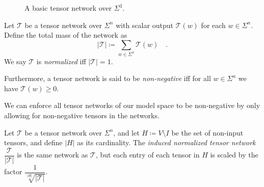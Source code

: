 \documentclass[../../main.tex]{subfiles}
\begin{document}
    \begin{figure}[h]
    \center
    \caption{A basic tensor network over $\Sigma^3$.}
    \end{figure}


    \bigskip
    \begin{definition}
        Let $\mathcal{T}$ be a tensor network over $\Sigma^n$ with scalar output $\mathcal{T}(w)$ for each $w \in \Sigma^n$. Define the total mass of the network as
        \[
            |\mathcal{T}| \coloneqq \sum_{w \in \Sigma^n} \mathcal{T}(w) \quad .
        \]
        We say $\mathcal{T}$ is \emph{normalized} iff $|\mathcal{T}| = 1$.

        Furthermore, a tensor network is said to be \emph{non-negative} iff for all $w \in \Sigma^n$ we have $\mathcal{T}(w) \geq 0$.
    \end{definition}

    \begin{remark}
        We can enforce all tensor networks of our model space to be non-negative by only allowing for non-negative tensors in the networks.
    \end{remark}

    \begin{definition}
        Let $\mathcal{T}$ be a tensor network over $\Sigma^n$, and let $H \coloneqq V \setminus I$ be the set of non-input tensors, and define $|H|$ as its cardinality. The \emph{induced normalized tensor network} $\dfrac{\mathcal{T}}{|\mathcal{T}|}$ is the same network as $\mathcal{T}$, but each entry of each tensor in $H$ is scaled by the factor $\dfrac{1}{\sqrt[|H|]{|\mathcal{T}|}}$.
    \end{definition}
\end{document}
